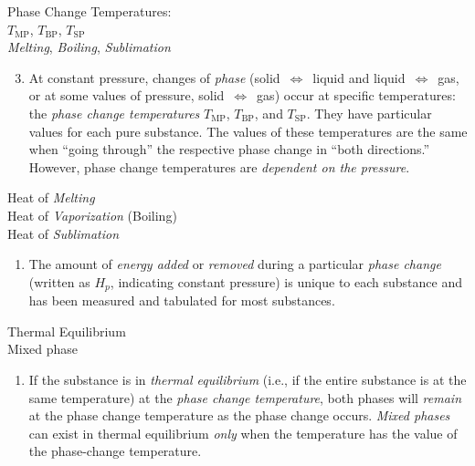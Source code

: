 \noindent
\begin{minipage}[c]{\leftcolumn}
	\baselineskip
	Phase Change Temperatures:\\
	\hspace*{5mm}$T_\text{MP}$, $T_\text{BP}$, $T_\text{SP}$\\
	\emph{Melting}, \emph{Boiling}, \emph{Sublimation}
\end{minipage}
\begin{minipage}[c]{\rightcolumn}
\begin{enumerate}\setcounter{enumi}{2}
	\item At constant pressure, changes of {\em phase} (solid~$\Leftrightarrow$~liquid and liquid~$\Leftrightarrow$~gas, or at some values of pressure, solid~$\Leftrightarrow$~gas) occur at specific temperatures: the \emph{phase change temperatures} $T_\text{MP}$, $T_\text{BP}$, and $T_\text{SP}$. They have particular values for each pure substance. The values of these temperatures are the same when ``going through'' the respective phase change in ``both directions.'' However, phase change temperatures are \emph{dependent on the pressure}.\\[0.2mm]
	\end{enumerate}
\end{minipage}

\noindent
\begin{minipage}[c]{\leftcolumn}
	\baselineskip
	Heat of \emph{Melting}\\
	Heat of \emph{Vaporization} (Boiling)\\
	Heat of \emph{Sublimation}\\[0.1mm]
\end{minipage}
\begin{minipage}[c]{\rightcolumn}
	\begin{enumerate}
		\item[] The amount of \emph{energy added} or \emph{removed} during a particular \emph{phase change} (written as $H_p$, indicating constant pressure) is unique to each substance and has been measured and tabulated for most substances.\\[0.2mm]
	\end{enumerate}
\end{minipage}

\noindent
\begin{minipage}[c]{\leftcolumn}
	\baselineskip
	Thermal Equilibrium\\
	Mixed phase
\end{minipage}
\begin{minipage}[c]{\rightcolumn}
	\begin{enumerate}
		\item[] If the substance is in \emph{thermal equilibrium} (i.e., if the entire substance is at the same temperature) at the \emph{phase change temperature}, both phases will \emph{remain} at the phase change temperature as the phase change occurs. \emph{Mixed phases} can exist in thermal equilibrium {\em only} when the temperature has the value of the phase-change temperature.\\[0.2mm]
	\end{enumerate}
\end{minipage}

